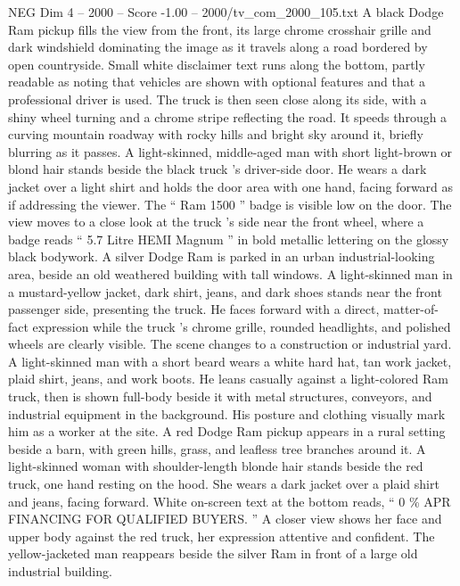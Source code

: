 \begin{textsample}{NEG Dim 4 – 2000 – Score -1.00 – 2000/tv\_com\_2000\_105.txt}  \label{ex:f4_neg_045}
A black Dodge Ram pickup fills the view from the front, its large chrome crosshair grille and dark windshield dominating the image as it travels along a road bordered by open countryside.
Small white disclaimer text runs along the bottom, partly readable as noting that vehicles are shown with optional features and that a professional driver is used.
The truck is then seen close along its side, with a shiny wheel turning and a chrome stripe reflecting the road.
It speeds through a curving mountain roadway with rocky hills and bright sky around it, briefly blurring as it passes.
A light-skinned, middle-aged man with short light-brown or blond hair stands beside the black truck ’s driver-side door.
He wears a dark jacket over a light shirt and holds the door area with one hand, facing forward as if addressing the viewer.
The “ Ram 1500 ” badge is visible low on the door.
The view moves to a close look at the truck ’s side near the front wheel, where a badge reads “ 5.7 Litre HEMI Magnum ” in bold metallic lettering on the glossy black bodywork.
A silver Dodge Ram is parked in an urban industrial-looking area, beside an old weathered building with tall windows.
A light-skinned man in a mustard-yellow jacket, dark shirt, jeans, and dark shoes stands near the front passenger side, presenting the truck.
He faces forward with a direct, matter-of-fact expression while the truck ’s chrome grille, rounded headlights, and polished wheels are clearly visible.
The scene changes to a construction or industrial yard.
A light-skinned man with a short beard wears a white hard hat, tan work jacket, plaid shirt, jeans, and work boots.
He leans casually against a light-colored Ram truck, then is shown full-body beside it with metal structures, conveyors, and industrial equipment in the background.
His posture and clothing visually mark him as a worker at the site.
A red Dodge Ram pickup appears in a rural setting beside a barn, with green hills, grass, and leafless tree branches around it.
A light-skinned woman with shoulder-length blonde hair stands beside the red truck, one hand resting on the hood.
She wears a dark jacket over a plaid shirt and jeans, facing forward.
White on-screen text at the bottom reads, “ 0 \% APR FINANCING FOR QUALIFIED BUYERS. ” A closer view shows her face and upper body against the red truck, her expression attentive and confident.
The yellow-jacketed man reappears beside the silver Ram in front of a large old industrial building.

\end{textsample}
